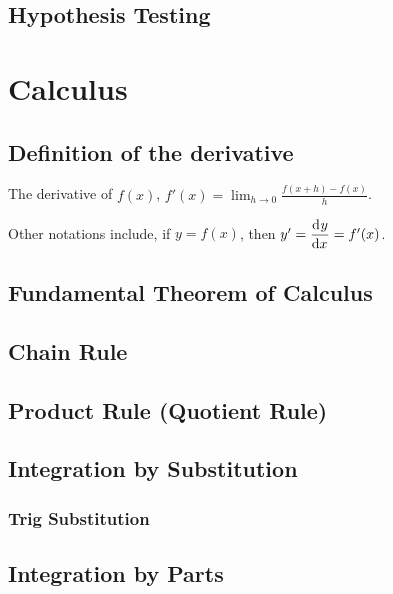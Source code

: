 \documentclass[a4paper,11pt]{article}
\begin{document}
    \subsection{Hypothesis Testing}


    \section{Calculus}


    \subsection{Definition of the derivative}

    The derivative of $f(x)$,
    $\displaystyle f'(x) = \lim_{h \to 0} \frac{f(x + h) - f(x)}{h}$.

    Other notations include, if $y = f(x)$, then
    $y' = \dod yx = f'(x)$.

    \subsection{Fundamental Theorem of Calculus} \label{sec:calc_FTC}

    \subsection{Chain Rule} \label{sec:calc_chain}

    \subsection{Product Rule (Quotient Rule)} \label{sec:calc_product}

    \subsection{Integration by Substitution} \label{sec:calc_substitution}

    \subsubsection{Trig Substitution} \label{sec:calc_trig_substitution}

    \subsection{Integration by Parts}
\end{document}
